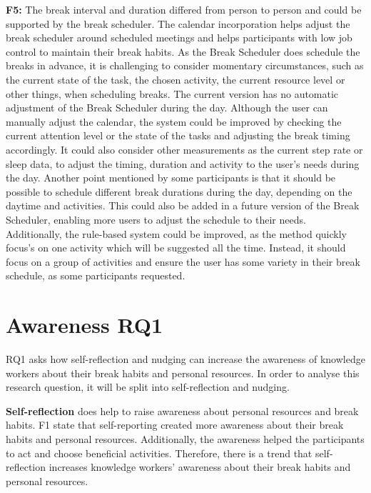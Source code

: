 \documentclass{hasel_thesis}
\begin{document}
\textbf{F5:} The break interval and duration differed from person to person and could be supported by the break scheduler. The calendar incorporation helps adjust the break scheduler around scheduled meetings and helps participants with low job control to maintain their break habits. As the Break Scheduler does schedule the breaks in advance, it is challenging to consider momentary circumstances, such as the current state of the task, the chosen activity, the current resource level or other things, when scheduling breaks. The current version has no automatic adjustment of the Break Scheduler during the day. Although the user can manually adjust the calendar, the system could be improved by checking the current attention level or the state of the tasks and adjusting the break timing accordingly. It could also consider other measurements as the current step rate or sleep data, to adjust the timing, duration and activity to the user's needs during the day. Another point mentioned by some participants is that it should be possible to schedule different break durations during the day, depending on the daytime and activities. This could also be added in a future version of the Break Scheduler, enabling more users to adjust the schedule to their needs. Additionally, the rule-based system could be improved, as the method quickly focus's on one activity which will be suggested all the time. Instead, it should focus on a group of activities and ensure the user has some variety in their break schedule, as some participants requested.


\section{Awareness RQ1} %

RQ1 asks how self-reflection and nudging can increase the awareness of knowledge workers about their break habits and personal resources. In order to analyse this research question, it will be split into self-reflection and nudging. 

\textbf{Self-reflection} does help to raise awareness about personal resources and break habits. F1 state that self-reporting created more awareness about their break habits and personal resources. Additionally, the awareness helped the participants to act and choose beneficial activities. Therefore, there is a trend that self-reflection increases knowledge workers' awareness about their break habits and personal resources. 
\end{document}
